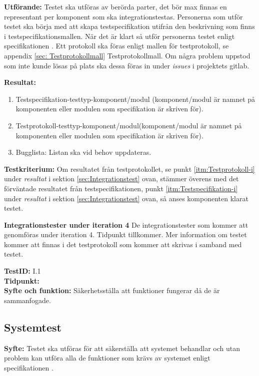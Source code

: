 \documentclass[a4paper,10pt, twoside]{article}
\begin{document}
\textbf{Utförande:}
Testet ska utföras av berörda parter, det bör max finnas en representant per komponent som ska integrationstestas. 
Personerna som utför testet ska börja med att skapa testspecifikation utifrån den beskrivning som finns i 
testspecifikationsmallen. När det är klart så utför personerna testet enligt specifikationen \cite{kravspec}. Ett 
protokoll ska föras enligt mallen för testprotokoll, se appendix \ref{sec: Testprotokollmall} Testprotokollmall. Om några 
problem uppstod som inte kunde lösas på plats ska dessa föras in under \emph{issues} i projektets gitlab.

\textbf{Resultat:}
\begin{enumerate}
\item \label{itm:Testspecifikation-i} Testspecifikation-testtyp-komponent/modul (komponent/modul är namnet på komponenten 
eller modulen som specifikation är skriven för).
\item \label{itm:Testprotokoll-i} Testprotokoll-testtyp-komponent/modul(komponent/modul är namnet på komponenten eller 
modulen som specifikation är skriven för).
\item Bugglista: Listan ska vid behov uppdateras.
\end{enumerate}

\textbf{Testkriterium:}
Om resultatet från testprotokollet, se punkt \ref{itm:Testprotokoll-i} under \emph{resultat} i sektion
\ref{sec:Integrationstest} ovan, stämmer överens med det förväntade resultatet från testspecifikationen, punkt 
\ref{itm:Testspecifikation-i} under \emph{resultat} i sektion \ref{sec:Integrationstest} ovan, så anses komponenten klarat 
testet.

\textbf{Integrationstester under iteration 4}
De integrationstester som kommer att genomföras under iteration 4. Tidpunkt tillkommer. Mer information om testet kommer 
att finnas i det testprotokoll som kommer att skrivas i samband med testet. 

\textbf{TestID:} I.1
\\ \textbf{Tidpunkt:}
\\ \textbf{Syfte och funktion:} Säkerhetsställa att funktioner fungerar då de är sammanfogade.  


\subsection{Systemtest}
\label{sec:Systemtest}
\textbf{Syfte:} Testet ska utföras för att säkerställa att systemet behandlar och utan problem kan utföra alla de 
funktioner som krävs av systemet enligt specifikationen \cite{kravspec}.
\end{document}
